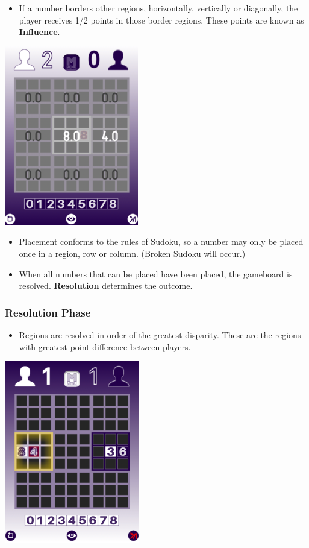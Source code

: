 \documentclass[a4paper]{article}
\begin{document}
\begin{itemize}
    \item If a number borders other regions, horizontally, vertically or diagonally, the player receives 
    1/2 points in those border regions.  These points are known as \textbf{Influence}.
\end{itemize}
\begin{center}
    \includegraphics[scale=0.5]{img/tutorial_3.png}
\end{center}

\begin{itemize}
    \item Placement conforms to the rules of Sudoku, so a number may only be placed once in a region, row or 
    column. (Broken Sudoku will occur.)
    \item When all numbers that can be placed have been placed, the gameboard is resolved. \textbf{Resolution} 
    determines the outcome.
\end{itemize}

\pagebreak
\subsubsection{Resolution Phase}

\begin{itemize}
    \item Regions are resolved in order of the greatest disparity. These are the regions with greatest point 
    difference between players.
\end{itemize}
\begin{center}
    \includegraphics[scale=0.5]{img/tutorial_4.png}
\end{center}
\end{document}
